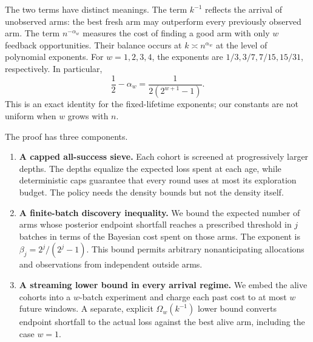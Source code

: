 \documentclass[11pt,letterpaper]{article}
\numberwithin{equation}{section}
\theoremstyle{definition}
\theoremstyle{remark}
\newcommand{\1}{\mathbf{1}}
\begin{document}
The two terms have distinct meanings. The term $k^{-1}$ reflects the arrival
of unobserved arms: the best fresh arm may outperform every previously
observed arm. The term $n^{-\alpha_w}$ measures the cost of finding a good
arm with only $w$ feedback opportunities. Their balance occurs at
$k\asymp n^{\alpha_w}$ at the level of polynomial exponents.
For $w=1,2,3,4$, the exponents are
$1/3,3/7,7/15,15/31$, respectively. In particular,
\begin{equation}\label{eq:exponent-gap}
  \frac12-\alpha_w=\frac{1}{2(2^{w+1}-1)}.
\end{equation}
This is an exact identity for the fixed-lifetime exponents; our constants
are not uniform when $w$ grows with $n$.

The proof has three components.
\begin{enumerate}[leftmargin=2em]
  \item \textbf{A capped all-success sieve.}
  Each cohort is screened at progressively larger depths. The depths
  equalize the expected loss spent at each age, while deterministic caps
  guarantee that every round uses at most its exploration budget.
  The policy needs the density bounds but not the density itself.
  \item \textbf{A finite-batch discovery inequality.}
  We bound the expected number of arms whose posterior endpoint shortfall
  reaches a prescribed threshold in $j$ batches in terms of the Bayesian
  cost spent on those arms. The exponent is
  $\beta_j=2^j/(2^j-1)$. This bound permits arbitrary nonanticipating
  allocations and observations from independent outside arms.
  \item \textbf{A streaming lower bound in every arrival regime.}
  We embed the alive cohorts into a $w$-batch experiment and charge each
  past cost to at most $w$ future windows. A separate, explicit
  $\Omega_w(k^{-1})$ lower bound converts endpoint shortfall to the actual
  loss against the best alive arm, including the case $w=1$.
\end{enumerate}
\end{document}
